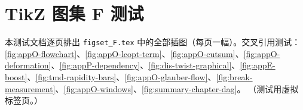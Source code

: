 

\chapter{TikZ 图集 F 测试}
本测试文档逐页排出 \texttt{figset\_F.tex} 中的全部插图（每页一幅）。交叉引用测试：\cref{fig:appO-flowchart}、\cref{fig:appO-lcopt-term}、\cref{fig:appO-cutsum}、\cref{fig:appO-deformation}、\cref{fig:appP-dependency}、\cref{fig:dis-twist-graphical}、\cref{fig:appE-boost}、\cref{fig:tmd-rapidity-bars}、\cref{fig:appO-glauber-flow}、\cref{fig:break-measurement}、\cref{fig:appO-windows}、\cref{fig:summary-chapter-dag}。
\clearpage
\clearpage
\clearpage
\clearpage
\clearpage
\clearpage
\clearpage
\clearpage
\clearpage
\clearpage
\clearpage
\clearpage
\clearpage
\noindent（测试用虚拟标签页。）

